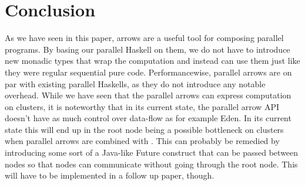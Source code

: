 \section{Conclusion}
As we have seen in this paper, arrows are a useful tool for composing parallel programs. By basing our parallel Haskell on them, we do not have to introduce new monadic types that wrap the computation and instead can use them just like they were regular sequential pure code. Performancewise, parallel arrows are on par with existing parallel Haskells, as they do not introduce any notable overhead. While we have seen that the parallel arrows can express computation on clusters, it is noteworthy that in its current state, the parallel arrow API doesn't have as much control over data-flow as for example Eden. In its current state this will end up in the root node being a possible bottleneck on clusters when parallel arrows are combined with \code{>>>}. This can probably be remedied by introducing some sort of a Java-like Future construct that can be passed between nodes so that nodes can communicate without going through the root node. This will have to be implemented in a follow up paper, though.